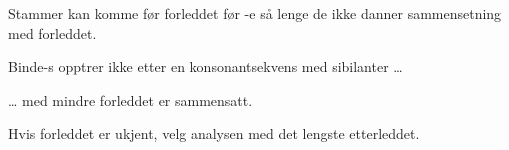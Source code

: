 \begin{enum}
		\newline
		\newline
	
	\item Stammer kan komme før forleddet før -e så lenge de ikke danner sammensetning med forleddet.
		
		\newline
	
	\item Binde-s opptrer ikke etter en konsonantsekvens med sibilanter … 
		
		\newline
	
	\item … med mindre forleddet er sammensatt.
		
		\newline
	
	\item Hvis forleddet er ukjent, velg analysen med det lengste etterleddet.
		
		\newline
	
\end{enum}

